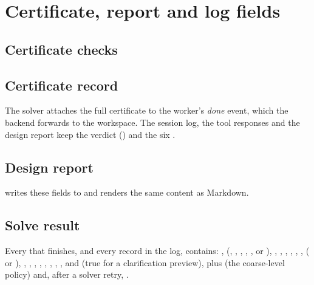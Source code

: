 \chapter{Certificate, report and log fields}\label{app:certificate}

\section{Certificate checks}


\section{Certificate record}
The solver attaches the full certificate to the worker's \emph{done} event, which the backend forwards to the
workspace. The session log, the tool responses and the design report keep the verdict () and the six
.



\section{Design report}
 writes these fields to \code{\_} and renders the same
content as Markdown.



\section{Solve result}
\sloppy
Every  that finishes, and every  record in the log, contains: , 
(, , , , ,  or
), , , , , , ,
 ( or ), , , ,
, , , , ,  and
 (true for a clarification preview), plus  (the coarse-level policy) and, after a
solver retry, .

